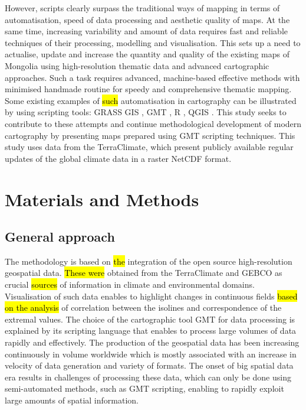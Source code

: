 \documentclass[geosciences,article,submit,pdftex,moreauthors]{Definitions/mdpi}
\begin{document}
However, scripts clearly surpass the traditional ways of mapping in terms of automatisation, speed of data processing and aesthetic quality of maps. At the same time, increasing variability and amount of data requires fast and reliable techniques of their processing, modelling and visualisation. This sets up a need to actualise, update and increase the quantity and quality of the existing maps of Mongolia using high-resolution thematic data and advanced cartographic approaches. Such a task requires advanced, machine-based effective methods with minimised handmade routine for speedy and comprehensive thematic mapping. Some existing examples of \hl{such} automatisation in cartography can be illustrated by using scripting tools: GRASS GIS \cite{FRIGERI20111265,Lemenkova2020f}, GMT \cite{5369602,Lemenkova2021g,BECKER20051075,Lemenkova2021h,OKUBO200459}, R \cite{Tserenpurev,Lemenkova2019b}, QGIS \cite{FANG202031,Lemenkova2020i}. This study seeks to contribute to these attempts and continue methodological development of modern cartography by presenting maps prepared using GMT scripting techniques. This study uses data from the TerraClimate, which present publicly available regular updates of the global climate data in a raster NetCDF format. 

\section{Materials and Methods}

\subsection{General approach}
The methodology is based on \hl{the} integration of the open source high-resolution geospatial data. \hl{These were} obtained from the TerraClimate and GEBCO as crucial \hl{sources} of information in climate and environmental domains. Visualisation of such data enables to highlight changes in continuous fields \hl{based on the analysis} of correlation between the isolines and correspondence of the extremal values. The choice of the cartographic tool GMT for data processing is explained by its scripting language that enables to process large volumes of data rapidly and effectively. The production of the geospatial data has been increasing continuously in volume worldwide which is mostly associated with an increase in velocity of data generation and variety of formats. The onset of big spatial data era results in challenges of processing these data, which can only be done using semi-automated methods, such as GMT scripting, enabling to rapidly exploit large amounts of spatial information. 
\end{document}
